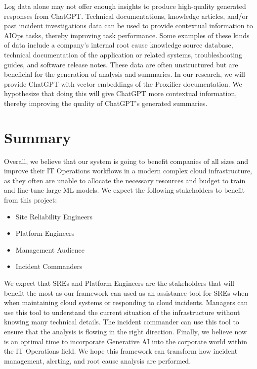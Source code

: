 \documentclass[conference]{IEEEtran}
\begin{document}
Log data alone may not offer enough insights to produce high-quality generated responses from ChatGPT. Technical documentations, knowledge articles, and/or past incident investigations data can be used to provide contextual information to AIOps tasks, thereby improving task performance. Some examples of these kinds of data include a company's internal root cause knowledge source database, technical documentation of the application or related systems, troubleshooting guides, and software release notes. These data are often unstructured but are beneficial for the generation of analysis and summaries. \cite{saha2022mining}  In our research, we will provide ChatGPT with vector embeddings of the Proxifier documentation. We hypothesize that doing this will give ChatGPT more contextual information, thereby improving the quality of ChatGPT's generated summaries.

\section{Summary}

Overall, we believe that our system is going to benefit companies of all sizes and improve their IT Operations workflows in a modern complex cloud infrastructure, as they often are unable to allocate the necessary resources and budget to train and fine-tune large ML models. We expect the following stakeholders to benefit from this project:
\begin{itemize}
    \item Site Reliability Engineers
    \item Platform Engineers 
    \item Management Audience 
    \item Incident Commanders 
\end{itemize}

We expect that SREs and Platform Engineers are the stakeholders that will benefit the most as our framework can used as an assistance tool for SREs when when maintaining cloud systems or responding to cloud incidents. Managers can use this tool to understand the current situation of the infrastructure without knowing many technical details. The incident commander can use this tool to ensure that the analysis is flowing in the right direction. Finally, we believe now is an optimal time to incorporate Generative AI into the corporate world within the IT Operations field. We hope this framework can transform how incident management, alerting, and root cause analysis are performed. 




\vspace{12pt}
\end{document}
